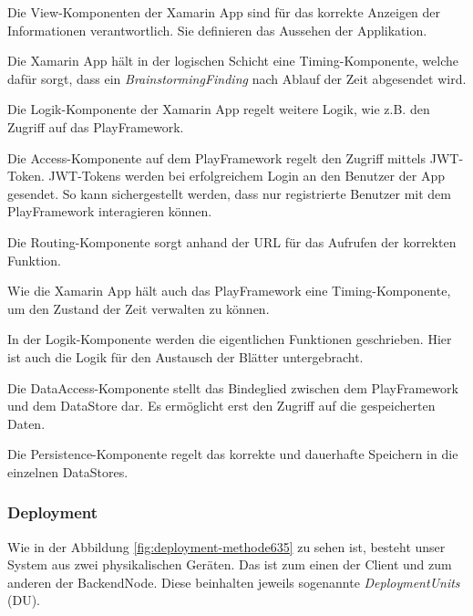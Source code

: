 \begin{description}[leftmargin=!,labelwidth=\widthof{\bfseries DataAccessComponent}]
	\item[ViewComponent] Die View-Komponenten der Xamarin App sind für das korrekte Anzeigen der Informationen verantwortlich. Sie definieren das Aussehen der Applikation.
	\item[AppTimingComponent] Die Xamarin App hält in der logischen Schicht eine Timing-Komponente, welche dafür sorgt, dass ein \textit{BrainstormingFinding} nach Ablauf der Zeit abgesendet wird.
	\item[AppLogicComponent] Die Logik-Komponente der Xamarin App regelt weitere Logik, wie z.B. den Zugriff auf das PlayFramework.
	\item[AccessComponent] Die Access-Komponente auf dem PlayFramework regelt den Zugriff mittels JWT-Token\cite{jwt}. JWT-Tokens werden bei erfolgreichem Login an den Benutzer der App gesendet. So kann sichergestellt werden, dass nur registrierte Benutzer mit dem PlayFramework interagieren können.
	\item[Routing] Die Routing-Komponente sorgt anhand der URL für das Aufrufen der korrekten Funktion.
	\item[TimingComponent] Wie die Xamarin App hält auch das PlayFramework eine Timing-Komponente, um den Zustand der Zeit verwalten zu können.
	\item[LogicComponent] In der Logik-Komponente werden die eigentlichen Funktionen geschrieben. Hier ist auch die Logik für den Austausch der Blätter untergebracht.
	\item[DataAccessComponent] Die DataAccess-Komponente stellt das Bindeglied zwischen dem PlayFramework und dem DataStore dar. Es ermöglicht erst den Zugriff auf die gespeicherten Daten.
	\item[PersistenceComponent] Die Persistence-Komponente regelt das korrekte und dauerhafte Speichern in die einzelnen DataStores.
\end{description}

\subsubsection{Deployment}
Wie in der Abbildung \ref{fig:deployment-methode635} zu sehen ist, besteht unser System aus zwei physikalischen Geräten. Das ist zum einen der Client und zum anderen der BackendNode. Diese beinhalten jeweils sogenannte \textit{DeploymentUnits} (DU). 

